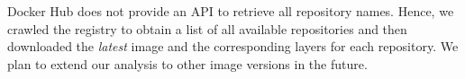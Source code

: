 Docker Hub does not provide an API to retrieve all repository names.
Hence, we crawled the registry to obtain a list of all available repositories
and then downloaded the \emph{latest} image and the corresponding layers for
each repository.
%
%
%
%
We plan to extend our analysis to other image versions in the future.
%
%
%
%

